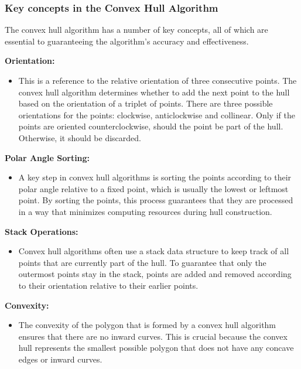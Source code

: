     \subsubsection{Key concepts in the Convex Hull Algorithm}
    The convex hull algorithm has a number of key concepts, all of which are essential to guaranteeing the algorithm's accuracy and effectiveness.

    \pagebreak

    \textbf{Orientation:}
    \begin{itemize}
        \item This is a reference to the relative orientation of three consecutive points. The convex hull algorithm determines whether to add the next point to the hull based on the orientation of a triplet of points. There are three possible orientations for the points: clockwise, anticlockwise and collinear. Only if the points are oriented counterclockwise, should the point be part of the hull. Otherwise, it should be discarded.
    \end{itemize}

    \textbf{Polar Angle Sorting:}
    \begin{itemize}
        \item A key step in convex hull algorithms is sorting the points according to their polar angle relative to a fixed point, which is usually the lowest or leftmost point. By sorting the points, this process guarantees that they are processed in a way that minimizes computing resources during hull construction.
    \end{itemize}

    \textbf{Stack Operations:}
    \begin{itemize}
        \item Convex hull algorithms often use a stack data structure to keep track of all points that are currently part of the hull. To guarantee that only the outermost points stay in the stack, points are added and removed according to their orientation relative to their earlier points.
    \end{itemize}

    \textbf{Convexity:}
    \begin{itemize}
        \item The convexity of the polygon that is formed by a convex hull algorithm ensures that there are no inward curves. This is crucial because the convex hull represents the smallest possible polygon that does not have any concave edges or inward curves.
    \end{itemize} \autocite{Andi:keyConcepts}

